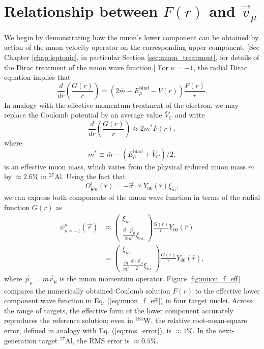 \documentclass{book}[letterpaper,12pt]
\begin{document}
\section{Relationship between $F(r)$ and $\vec{v}_{\mu}$}
\label{chap:muon_lower}
We begin by demonstrating how the muon's lower component can be obtained by action of the muon velocity operator on the corresponding upper component. [See Chapter \ref{chap:leptonic}, in particular Section \ref{sec:muon_treatment}, for details of the Dirac treatment of the muon wave function.] For $\kappa=-1$, the radial Dirac equation implies that
\begin{equation}
\frac{d}{dr}\left(\frac{G(r)}{r}\right)=\left(2\bar{m}-E^\mathrm{bind}_{\mu}-V(r)\right)\frac{F(r)}{r}.
\end{equation}
In analogy with the effective momentum treatment of the electron, we may replace the Coulomb potential by an average value $\bar{V}_C$ and write
\begin{equation}
\frac{d}{dr}\left(\frac{G(r)}{r}\right)\approx 2m^*F(r),
\end{equation}
where
\begin{equation}
m^*\equiv \bar{m}-\left(E^\mathrm{bind}_{\mu}+\bar{V}_C\right)/2,
\end{equation}
is an effective muon mass, which varies from the physical reduced muon mass $\bar{m}$ by $\approx 2.6$\% in $^{27}$Al. Using the fact that 
\begin{equation}
\Omega^1_{\frac{1}{2}m}(\hat{r})=-\vec{\sigma}\cdot\hat{r}\;Y_{00}(\hat{r})\xi_m,
\end{equation}
we can express both components of the muon wave function in terms of the radial function $G(r)$ as
\begin{equation}
\begin{split}
\psi^{\mu}_{\kappa=-1}(\vec{r})&\approx\left(\begin{array}{c}
\xi_m\\
\frac{\vec{\sigma}\cdot\vec{p}_{\mu}}{2m^*}\xi_m
\end{array}\right)\frac{G(r)}{r}Y_{00}(\hat{r})\\
&=\left(\begin{array}{c}
\xi_m\\
\frac{\bar{m}}{m^*}\frac{\vec{\sigma}\cdot\vec{v}_{\mu}}{2}\xi_m
\end{array}\right)\frac{G(r)}{r}Y_{00}(\hat{r}),
\end{split}
\label{eq:muon_f_eff}
\end{equation}
where $\vec{p}_{\mu}=\bar{m}\vec{v}_{\mu}$ is the muon momentum operator. Figure \ref{fig:muon_f_eff} compares the numerically obtained Coulomb solution $F(r)$ to the effective lower component wave function in Eq. (\ref{eq:muon_f_eff}) in four target nuclei. Across the range of targets, the effective form of the lower component accurately reproduces the reference solution; even in $^{184}$W, the relative root-mean-square error, defined in analogy with Eq. (\ref{eq:rms_error}), is $\approx 1\%$. In the next-generation target $^{27}$Al, the RMS error is $\approx 0.5\%$. 
\end{document}
